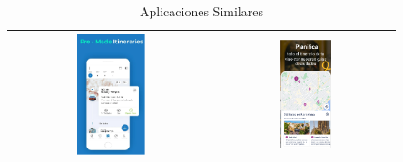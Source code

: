 \begin{table}[h!]
\begin{tabular}{cc}
	\includegraphics[width=0.35\textwidth]{img/visit_a_city.png} & \includegraphics[width=0.31\textwidth]{img/tiquets.png} \\
	\hline
	\end{tabular}
	\caption{Aplicaciones Similares}
	\label{fig:apps_similares}
	\end{table}

\newpage

